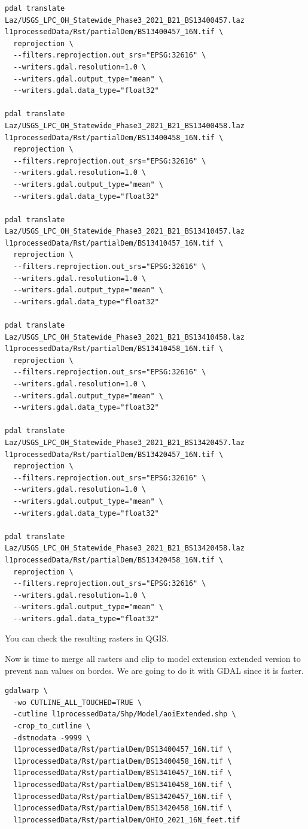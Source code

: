 \documentclass[11pt, a4paper]{article}
\begin{document}
\begin{lstlisting}[style=bashdark, title={Linux Terminal Session}]
pdal translate Laz/USGS_LPC_OH_Statewide_Phase3_2021_B21_BS13400457.laz l1processedData/Rst/partialDem/BS13400457_16N.tif \
  reprojection \
  --filters.reprojection.out_srs="EPSG:32616" \
  --writers.gdal.resolution=1.0 \
  --writers.gdal.output_type="mean" \
  --writers.gdal.data_type="float32" 

pdal translate Laz/USGS_LPC_OH_Statewide_Phase3_2021_B21_BS13400458.laz l1processedData/Rst/partialDem/BS13400458_16N.tif \
  reprojection \
  --filters.reprojection.out_srs="EPSG:32616" \
  --writers.gdal.resolution=1.0 \
  --writers.gdal.output_type="mean" \
  --writers.gdal.data_type="float32" 

pdal translate Laz/USGS_LPC_OH_Statewide_Phase3_2021_B21_BS13410457.laz l1processedData/Rst/partialDem/BS13410457_16N.tif \
  reprojection \
  --filters.reprojection.out_srs="EPSG:32616" \
  --writers.gdal.resolution=1.0 \
  --writers.gdal.output_type="mean" \
  --writers.gdal.data_type="float32" 

pdal translate Laz/USGS_LPC_OH_Statewide_Phase3_2021_B21_BS13410458.laz l1processedData/Rst/partialDem/BS13410458_16N.tif \
  reprojection \
  --filters.reprojection.out_srs="EPSG:32616" \
  --writers.gdal.resolution=1.0 \
  --writers.gdal.output_type="mean" \
  --writers.gdal.data_type="float32" 

pdal translate Laz/USGS_LPC_OH_Statewide_Phase3_2021_B21_BS13420457.laz l1processedData/Rst/partialDem/BS13420457_16N.tif \
  reprojection \
  --filters.reprojection.out_srs="EPSG:32616" \
  --writers.gdal.resolution=1.0 \
  --writers.gdal.output_type="mean" \
  --writers.gdal.data_type="float32" 

pdal translate Laz/USGS_LPC_OH_Statewide_Phase3_2021_B21_BS13420458.laz l1processedData/Rst/partialDem/BS13420458_16N.tif \
  reprojection \
  --filters.reprojection.out_srs="EPSG:32616" \
  --writers.gdal.resolution=1.0 \
  --writers.gdal.output_type="mean" \
  --writers.gdal.data_type="float32" 
\end{lstlisting}

You can check the resulting rasters in QGIS. 

Now is time to merge all rasters and clip to model extension extended version to prevent nan values on bordes. We are going to do it with GDAL since it is faster.

\begin{lstlisting}[style=bashdark, title={Linux Terminal Session}]
gdalwarp \
  -wo CUTLINE_ALL_TOUCHED=TRUE \
  -cutline l1processedData/Shp/Model/aoiExtended.shp \
  -crop_to_cutline \
  -dstnodata -9999 \
  l1processedData/Rst/partialDem/BS13400457_16N.tif \
  l1processedData/Rst/partialDem/BS13400458_16N.tif \
  l1processedData/Rst/partialDem/BS13410457_16N.tif \
  l1processedData/Rst/partialDem/BS13410458_16N.tif \
  l1processedData/Rst/partialDem/BS13420457_16N.tif \
  l1processedData/Rst/partialDem/BS13420458_16N.tif \
  l1processedData/Rst/partialDem/OHIO_2021_16N_feet.tif
\end{lstlisting}
\end{document}
